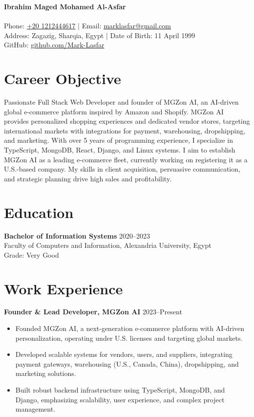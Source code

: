 \documentclass[a4paper,11pt]{article}
\begin{document}
\begin{center}
    {\LARGE\bfseries Ibrahim Maged Mohamed Al-Asfar} \\[0.5em]
    \hrulefill \\[0.5em]
    Phone: \href{tel:+201212444617}{+20 1212444617} \quad | \quad 
    Email: \href{mailto:marklasfar@gmail.com}{marklasfar@gmail.com} \\
    Address: Zagazig, Sharqia, Egypt \quad | \quad 
    Date of Birth: 11 April 1999 \\
    GitHub: \href{https://github.com/Mark-Lasfar}{github.com/Mark-Lasfar}
\end{center}

\section*{Career Objective}
Passionate Full Stack Web Developer and founder of MGZon AI, an AI-driven global e-commerce platform inspired by Amazon and Shopify. MGZon AI provides personalized shopping experiences and dedicated vendor stores, targeting international markets with integrations for payment, warehousing, dropshipping, and marketing. With over 5 years of programming experience, I specialize in TypeScript, MongoDB, React, Django, and Linux systems. I aim to establish MGZon AI as a leading e-commerce fleet, currently working on registering it as a U.S.-based company. My skills in client acquisition, persuasive communication, and strategic planning drive high sales and profitability.

\section*{Education}
\textbf{Bachelor of Information Systems} \hfill 2020--2023 \\
Faculty of Computers and Information, Alexandria University, Egypt \\
Grade: Very Good

\section*{Work Experience}
\textbf{Founder \& Lead Developer, MGZon AI} \hfill 2023--Present
\begin{itemize}
    \item Founded MGZon AI, a next-generation e-commerce platform with AI-driven personalization, operating under U.S. licenses and targeting global markets.
    \item Developed scalable systems for vendors, users, and suppliers, integrating payment gateways, warehousing (U.S., Canada, China), dropshipping, and marketing solutions.
    \item Built robust backend infrastructure using TypeScript, MongoDB, and Django, emphasizing scalability, user experience, and complex project management.
\end{itemize}
\end{document}
